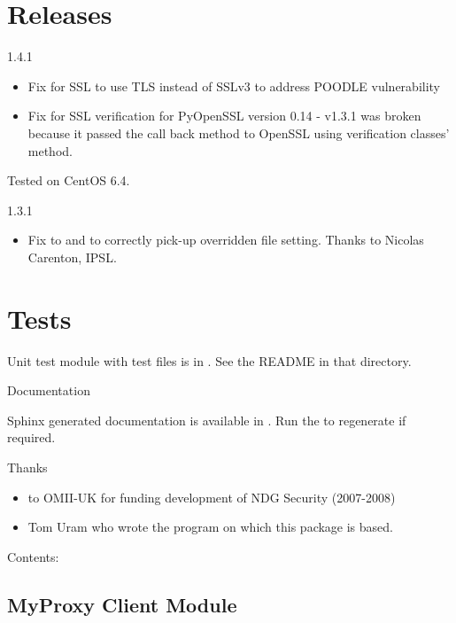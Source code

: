 \documentclass[letterpaper,10pt,english]{sphinxmanual}
\begin{document}


\chapter{Releases}
\label{index:releases}
1.4.1
\begin{itemize}
\item {} 
Fix for SSL to use TLS instead of SSLv3 to address POODLE vulnerability

\item {} 
Fix for SSL verification for PyOpenSSL version 0.14 - v1.3.1 was broken
because it passed the call back method to OpenSSL using verification classes'
 method.

\end{itemize}

Tested on CentOS 6.4.

1.3.1
\begin{itemize}
\item {} 
Fix to  and 
to correctly pick-up overridden file setting.  Thanks to Nicolas Carenton,
IPSL.

\end{itemize}


\chapter{Tests}
\label{index:tests}
Unit test module with test files is in .  See the README in that
directory.

Documentation

Sphinx generated documentation is available in .  Run the
 to regenerate if required.

Thanks
\begin{itemize}
\item {} 
to OMII-UK for funding development of NDG Security (2007-2008)

\item {} 
Tom Uram who wrote the  program on which this package is
based.

\end{itemize}

Contents:


\section{MyProxy Client Module}
\label{client:myproxy-client-module}\label{client::doc}
\end{document}
